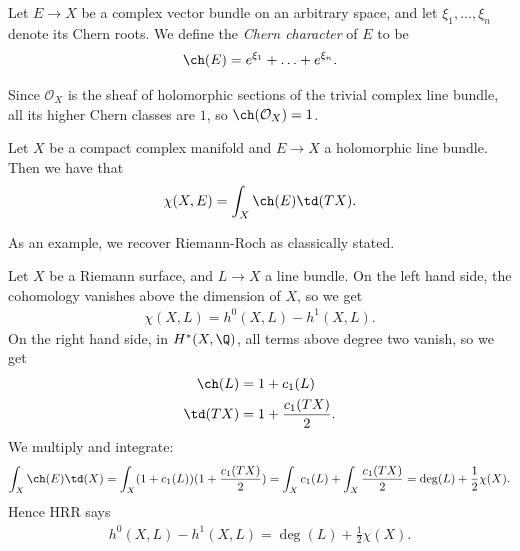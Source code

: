 \documentclass[11pt]{book}
\begin{document}
\begin{definition}\label{def:chern-character} Let $E \to X$ be a complex vector bundle on an arbitrary space, and let $\xi_1, \ldots, \xi_n$ denote its Chern roots. We define the \emph{Chern character} of $E$ to be
\begin{align*}
    \ch(E) = e^{\xi_1} + \ldots + e^{\xi_n}.
\end{align*}
\end{definition}

\begin{example}
Since $\mathcal{O}_X$ is the sheaf of holomorphic sections of the trivial complex line bundle, all its higher Chern classes are $1$, so $\ch(\mathcal{O}_X) = 1$.
\end{example}

\begin{theorem} Let $X$ be a compact complex manifold and $E \to X$ a holomorphic line bundle. Then we have that
\begin{align*}
    \chi(X,E) = \int_X \ch(E) \td(TX).
\end{align*}
\end{theorem}

As an example, we recover Riemann-Roch as classically stated.

\begin{example} Let $X$ be a Riemann surface, and $L \to X$ a line bundle. On the left hand side, the cohomology vanishes above the dimension of $X$, so we get
\begin{align*}
    \chi(X,L) = h^0(X,L) - h^1(X,L).
\end{align*}
On the right hand side, in $H^\ast(X,\Q)$, all terms above degree two vanish, so we get
\begin{align*}
    \ch(L) &= 1 + c_1(L)  \\
    \td(TX) &= 1 + \frac{c_1(TX)}{2}.
\end{align*}
We multiply and integrate:
\begin{align*}
    \int_X \ch(E) \td(X) = \int_X (1 + c_1(L))(1 + \frac{c_1(TX)}{2}) = \int_X c_1(L) + \int_X \frac{c_1(TX)}{2} = \deg(L) + \frac{1}{2}\chi(X).
\end{align*}
Hence HRR says
\begin{align*}
    h^0(X,L) - h^1(X,L) = \deg(L) + \frac{1}{2}\chi(X).
\end{align*}
\end{example}
\end{document}
